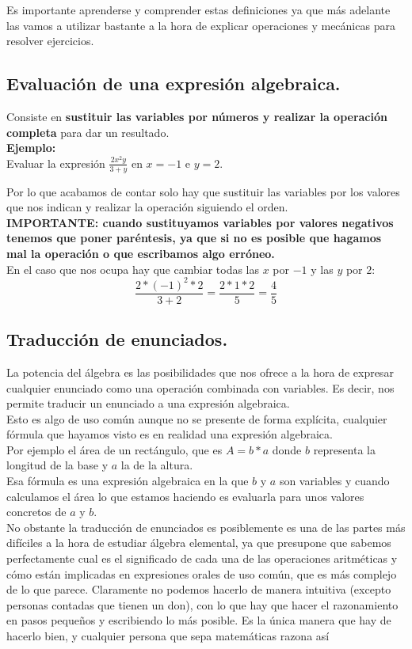 \documentclass[a4paper,11pt,answers]{exam}
\begin{document}
  Es importante aprenderse y comprender estas definiciones ya que más adelante las vamos a utilizar bastante a la hora de explicar operaciones y mecánicas para resolver ejercicios.

  \subsection{Evaluación de una expresión algebraica.}
  Consiste en \textbf{sustituir las variables por números y realizar la operación completa} para dar un resultado.\\
  \textbf{Ejemplo:}\\
  Evaluar la expresión $\frac{2x^2 y}{3 + y}$ en $x=-1$ e $y=2$.
  \begin{solution}
    Por lo que acabamos de contar solo hay que sustituir las variables por los valores que nos indican y realizar la operación siguiendo el orden.\\
    \textbf{IMPORTANTE: cuando sustituyamos variables por valores negativos tenemos que poner paréntesis, ya que si no es posible que hagamos mal la operación o que escribamos algo erróneo.}\\

    En el caso que nos ocupa hay que cambiar todas las $x$ por $-1$ y las $y$ por $2$:
    \[\frac{2*(-1)^2 * 2}{3 +2} = \frac{2*1 *2}{5} = \frac{4}{5}\]
  \end{solution}
  \subsection{Traducción de enunciados.}
  La potencia del álgebra es las posibilidades que nos ofrece a la hora de expresar cualquier enunciado como una operación combinada con variables. Es decir, nos permite traducir un enunciado a una expresión algebraica.\\
  Esto es algo de uso común aunque no se presente de forma explícita, cualquier fórmula que hayamos visto es en realidad una expresión algebraica.\\
  Por ejemplo el área de un rectángulo, que es $A = b*a$ donde $b$ representa la longitud de la base y $a$ la de la altura.\\
  Esa fórmula es una expresión algebraica en la que $b$ y $a$ son variables y cuando calculamos el área lo que estamos haciendo es evaluarla para unos valores concretos de $a$ y $b$.\\

  No obstante la traducción de enunciados es posiblemente es una de las partes más difíciles a la hora de estudiar álgebra elemental, ya que presupone que sabemos perfectamente cual es el significado de cada una de las operaciones aritméticas y cómo están implicadas en expresiones orales de uso común, que es más complejo de lo que parece.
  Claramente no podemos hacerlo de manera intuitiva (excepto personas contadas que tienen un don), con lo que hay que hacer el razonamiento en pasos pequeños y escribiendo lo más posible. Es la única manera que hay de hacerlo bien, y cualquier persona que sepa matemáticas razona así\\
\end{document}
